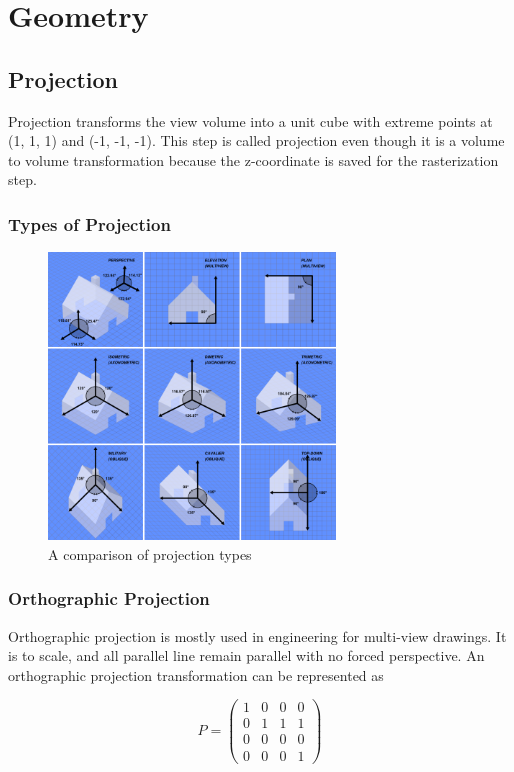 \documentclass{article}
\begin{document}
\section{Geometry}
\subsection{Projection}
Projection transforms the view volume into a unit cube with extreme points at (1, 1, 1) and (-1, -1, -1). This step is called projection even though it is a volume to volume transformation because the z-coordinate is saved for the rasterization step.

\subsubsection{Types of Projection}

\begin{figure}
    \centering
    \includegraphics[width=3.0in]{Graphical_projection_comparison.png}
    \caption{A comparison of projection types}
    \label{projectiontypes}
\end{figure}

\subsubsection{Orthographic Projection}
Orthographic projection is mostly used in engineering for multi-view drawings. It is to scale, and all parallel line remain parallel with no forced perspective. An orthographic projection transformation can be represented as

\[ P = \begin{pmatrix}
  1 & 0 & 0 & 0 \\
  0 & 1 & 1 & 1 \\
  0 & 0 & 0 & 0 \\
  0 & 0 & 0 & 1 
 \end{pmatrix}\]	
\end{document}
